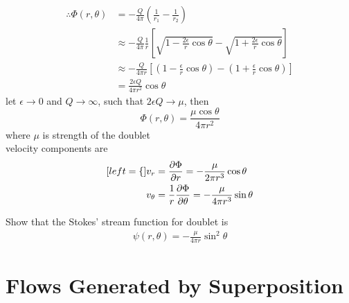 \begin{itemize}
\begin{align*}
\therefore\Phi(r,\theta)
&= -\frac{Q}{4\pi}\left(\frac{1}{r_1}-\frac{1}{r_2}\right) \\
&\approx -\frac{Q}{4\pi}\frac{1}{r}\left[\sqrt{1-\frac{2\epsilon}{r}\cos\theta} - \sqrt{1+\frac{2\epsilon}{r}\cos\theta}\right] \\
&\approx -\frac{Q}{4\pi r}\left[\left(1-\frac{\epsilon}{r}\cos\theta\right) - \left(1+\frac{\epsilon}{r}\cos\theta\right)\right] \\
&= \frac{2\epsilon Q}{4\pi r^2}\cos\theta
\end{align*}
let $\epsilon\to 0$ and $Q\to\infty$, such that $2\epsilon Q\to \mu$, then
\begin{equation}
\Phi(r,\theta) = \frac{\mu\cos\theta}{4\pi r^2}
\label{eq: 7-2-10}
\end{equation}
where $\mu$ is strength of the doublet\\

velocity components are
\begin{subequations}
\label{eq: 7-2-6}
\begin{align}[left = \empheqlbrace\,]
v_r&=\frac{\partial\Phi}{\partial r} = -\frac{\mu}{2\pi r^3}\cos\theta \label{eq: 7-2-6a} \\
v_\theta&=\frac{1}{r}\frac{\partial\Phi}{\partial \theta} = -\frac{\mu}{4\pi r^3}\sin\theta  \label{eq: 7-2-6b}
\end{align}
\end{subequations}
\begin{exercise}{Show that the Stokes' stream function for doublet is}
\begin{align}
\psi(r,\theta) 
= -\frac{\mu}{4\pi r}\sin^2\theta \label{eq: 7-2-8}
\end{align}
\end{exercise}
\end{itemize}
\section{Flows Generated by Superposition}

